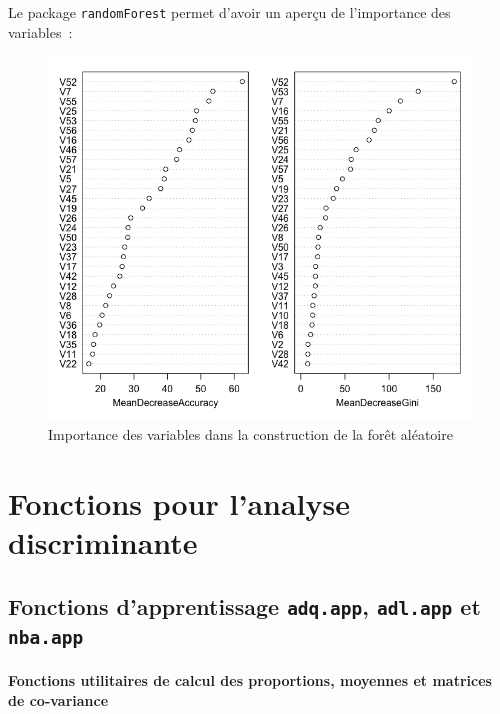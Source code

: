 \documentclass[a4paper,10pt]{report}
\begin{document}
Le package \texttt{randomForest} permet d'avoir un aperçu de l'importance des variables~:
\begin{figure}[H]
	\centering
	\captionsetup{justification=centering, margin=2cm}
	\includegraphics[width=.6\linewidth]{img/3-4-Spam-forests-variables-importance}
	\caption{\small Importance des variables dans la construction de la forêt aléatoire}
	\label{3-4-Spam-forests-variables-importance}%
\end{figure}


























\appendix


\chapter{Fonctions pour l'analyse discriminante}
\label{appendix:functions-ana-disc}

\section{Fonctions d'apprentissage \texttt{adq.app}, \texttt{adl.app} et \texttt{nba.app}}
\label{appendix:functions-ana-disc-app}

\subsubsection{Fonctions utilitaires de calcul des proportions, moyennes et matrices de co-variance}
\end{document}
